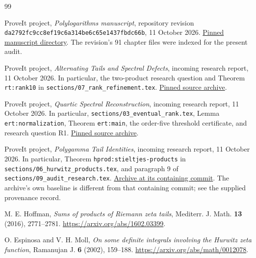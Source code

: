 \clearpage
{}
{}
\begingroup\small
\begin{thebibliography}{99}
\raggedright
\setlength{\itemsep}{3pt}
\setlength{\parskip}{0pt}

ProveIt project,
\emph{Polylogarithms manuscript}, repository revision
\texttt{da2792fc9cc8ef19c6a314be6c65e1437fbdc66b},
11 October 2026.
\href{https://github.com/VladimirReshetnikov/ProveIt/tree/da2792fc9cc8ef19c6a314be6c65e1437fbdc66b/Analysis/Polylogarithms/docs/manuscript}{Pinned manuscript directory}.
The revision's 91 chapter files were indexed for the present audit.

ProveIt project,
\emph{Alternating Tails and Spectral Defects}, incoming research report,
11 October 2026. In particular, the two-product research question and
Theorem \texttt{rt:rank10} in \texttt{sections/07\_rank\_refinement.tex}.
\href{https://github.com/VladimirReshetnikov/ProveIt/blob/da2792fc9cc8ef19c6a314be6c65e1437fbdc66b/docs/incoming/ProveIt_Alternating_Tails_Spectral_Defects_2026-10-11.zip}{Pinned source archive}.

ProveIt project,
\emph{Quartic Spectral Reconstruction}, incoming research report,
11 October 2026. In particular, \texttt{sections/03\_eventual\_rank.tex},
Lemma \texttt{ert:normalization}, Theorem \texttt{ert:main}, the
order-five threshold certificate, and research question R1.
\href{https://github.com/VladimirReshetnikov/ProveIt/blob/da2792fc9cc8ef19c6a314be6c65e1437fbdc66b/docs/incoming/ProveIt_Quartic_Spectral_Reconstruction_2026-10-11.zip}{Pinned source archive}.

ProveIt project,
\emph{Polygamma Tail Identities}, incoming research report,
11 October 2026. In particular, Theorem
\texttt{hprod:stieltjes-products} in
\texttt{sections/06\_hurwitz\_products.tex}, and paragraph 9 of
\texttt{sections/09\_audit\_research.tex}.
\href{https://github.com/VladimirReshetnikov/ProveIt/blob/446dca9bd65c20e409d1d2561d4ffad408103e2a/docs/incoming/ProveIt_Polygamma_Tail_Identities_2026-10-11.zip}{Archive at its containing commit}.
The archive's own baseline is different from that containing commit;
see the supplied provenance record.

M. E. Hoffman,
\emph{Sums of products of Riemann zeta tails},
Mediterr. J. Math. \textbf{13} (2016), 2771--2781.
\url{https://arxiv.org/abs/1602.03399}.

O. Espinosa and V. H. Moll,
\emph{On some definite integrals involving the Hurwitz zeta function},
Ramanujan J. \textbf{6} (2002), 159--188.
\url{https://arxiv.org/abs/math/0012078}.


\end{thebibliography}

